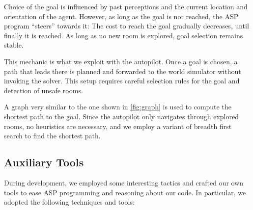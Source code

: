 \documentclass{llncs}
\begin{document}
Choice of the goal is influenced by past perceptions and the current location and orientation of the agent. However, as long as the goal is not reached, the ASP program \enquote{steers} towards it: The cost to reach the goal gradually decreases, until finally it is reached. As long as no new room is explored, goal selection remains stable.

This mechanic is what we exploit with the autopilot. Once a goal is chosen, a path that leads there is planned and forwarded to the world simulator without invoking the solver. This setup requires careful selection rules for the goal and detection of unsafe rooms.

A graph very similar to the one shown in \ref{fig:graph} is used to compute the shortest path to the goal.
Since the autopilot only navigates through explored rooms, no heuristics are necessary, and we employ a variant of breadth first search to find the shortest path.


\subsection{Auxiliary Tools}

During development, we employed some interesting tactics and crafted our own tools to ease ASP programming and reasoning about our code. In particular, we adopted the following techniques and tools:
\end{document}
